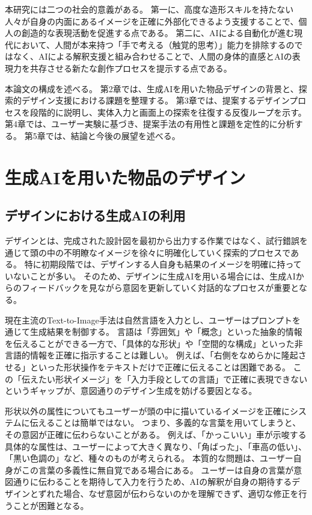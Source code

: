 \documentclass{kuisthesis}
\begin{document}
本研究には二つの社会的意義がある。
第一に、高度な造形スキルを持たない人々が自身の内面にあるイメージを正確に外部化できるよう支援することで、個人の創造的な表現活動を促進する点である。
第二に、AIによる自動化が進む現代において、人間が本来持つ「手で考える（触覚的思考）」能力を排除するのではなく、AIによる解釈支援と組み合わせることで、人間の身体的直感とAIの表現力を共存させる新たな創作プロセスを提示する点である。

本論文の構成を述べる。
第2章では、生成AIを用いた物品デザインの背景と、探索的デザイン支援における課題を整理する。
第3章では、提案するデザインプロセスを段階的に説明し、実体入力と画面上の探索を往復する反復ループを示す。
第4章では、ユーザー実験に基づき、提案手法の有用性と課題を定性的に分析する。
第5章では、結論と今後の展望を述べる。



\section{生成AIを用いた物品のデザイン}
\subsection{デザインにおける生成AIの利用}
デザインとは、完成された設計図を最初から出力する作業ではなく、試行錯誤を通じて頭の中の不明瞭なイメージを徐々に明確化していく探索的プロセスである。
特に初期段階では、デザインする人自身も結果のイメージを明確に持っていないことが多い。
そのため、デザインに生成AIを用いる場合には、生成AIからのフィードバックを見ながら意図を更新していく対話的なプロセスが重要となる。

現在主流のText-to-Image手法は自然言語を入力とし、ユーザーはプロンプトを通じて生成結果を制御する。
言語は「雰囲気」や「概念」といった抽象的情報を伝えることができる一方で、「具体的な形状」や「空間的な構成」といった非言語的情報を正確に指示することは難しい。
例えば、「右側をなめらかに隆起させる」といった形状操作をテキストだけで正確に伝えることは困難である。
この「伝えたい形状イメージ」を「入力手段としての言語」で正確に表現できないというギャップが、意図通りのデザイン生成を妨げる要因となる。

形状以外の属性についてもユーザーが頭の中に描いているイメージを正確にシステムに伝えることは簡単ではない。
つまり、多義的な言葉を用いてしまうと、その意図が正確に伝わらないことがある。
例えば、「かっこいい」車が示唆する具体的な属性は、ユーザーによって大きく異なり、「角ばった」、「車高の低い」、「黒い色調の」など、種々のものが考えられる。
本質的な問題は、ユーザー自身がこの言葉の多義性に無自覚である場合にある。
ユーザーは自身の言葉が意図通りに伝わることを期待して入力を行うため、AIの解釈が自身の期待するデザインとずれた場合、なぜ意図が伝わらないのかを理解できず、適切な修正を行うことが困難となる。
\end{document}
